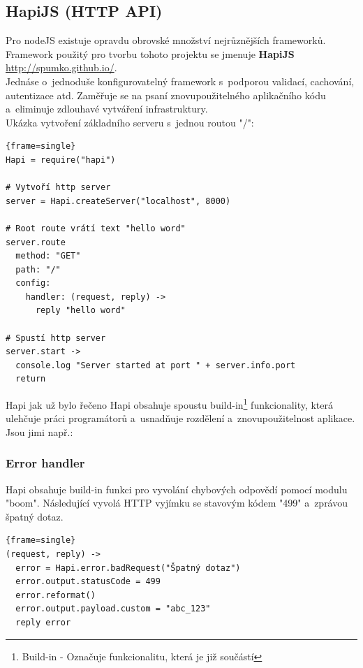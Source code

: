 \documentclass[a4paper,12pt,twoside,BCOR=10mm]{article}
\renewcommand{\b}[1]{\textbf{#1}} %
\newenvironment{codeframe}{%
  \begin{Sbox} 
    \begin{minipage} 
      {\columnwidth-\leftmargin-\rightmargin-2\fboxsep-2\fboxrule-4pt} 
}{%

  \end{minipage} 
  \end{Sbox} 
  \begin{center} 
    \fcolorbox{black}{codeback}{\TheSbox} 
  \end{center} 
}
\begin{document}
\subsection{HapiJS (HTTP API)}
Pro nodeJS existuje opravdu obrovské množství nejrůznějších frameworků. Framework použitý pro tvorbu tohoto projektu se jmenuje \b{HapiJS} \href{http://spumko.github.io/}{http://spumko.github.io/}.\\

Jednáse o~jednoduše konfigurovatelný framework s~podporou validací, cachování, autentizace atd. Zaměřuje se na psaní znovupoužitelného aplikačního kódu a~eliminuje zdlouhavé vytváření infrastruktury.\cite{hapiJS}\\

Ukázka vytvoření základního serveru s~jednou routou "/":

     \begin{codeframe} 
      \begin{Verbatim}{frame=single}
Hapi = require("hapi")

# Vytvoří http server
server = Hapi.createServer("localhost", 8000)

# Root route vrátí text "hello word"
server.route
  method: "GET"
  path: "/"
  config:
    handler: (request, reply) ->
      reply "hello word"

# Spustí http server
server.start ->
  console.log "Server started at port " + server.info.port
  return
\end{Verbatim} 
    \end{codeframe}

Hapi jak už bylo řečeno Hapi obsahuje spoustu build-in\footnote{Build-in - Označuje funkcionalitu, která je již součástí} funkcionality, která ulehčuje práci programátorů a~usnadňuje rozdělení a~znovupoužitelnost aplikace. Jsou jimi např.:\\

\subsubsection{Error handler}
Hapi obsahuje build-in funkci pro vyvolání chybových odpovědí pomocí modulu "boom". Následující vyvolá HTTP vyjímku se stavovým kódem "499" a~zprávou špatný dotaz.\cite{hapiJSDOC}

     \begin{codeframe} 
      \begin{Verbatim}{frame=single}
(request, reply) ->
  error = Hapi.error.badRequest("Špatný dotaz")
  error.output.statusCode = 499
  error.reformat()
  error.output.payload.custom = "abc_123"
  reply error
\end{Verbatim} 
    \end{codeframe}
\end{document}
